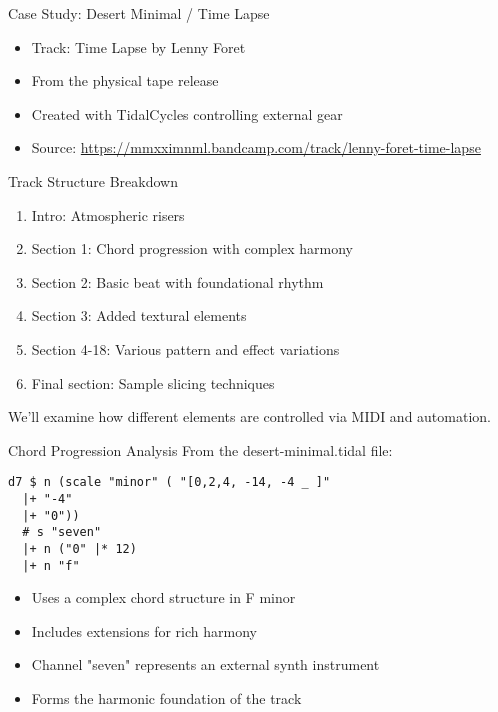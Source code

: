 \documentclass{beamer}
\begin{document}
\begin{frame}{Case Study: Desert Minimal / Time Lapse}
\begin{itemize}
    \item Track: Time Lapse by Lenny Foret
    \item From the physical tape release
    \item Created with TidalCycles controlling external gear
    \item Source: \url{https://mmxximnml.bandcamp.com/track/lenny-foret-time-lapse}
\end{itemize}
\end{frame}


\begin{frame}[fragile]{Track Structure Breakdown}
\begin{enumerate}
    \item Intro: Atmospheric risers
    \item Section 1: Chord progression with complex harmony
    \item Section 2: Basic beat with foundational rhythm
    \item Section 3: Added textural elements
    \item Section 4-18: Various pattern and effect variations
    \item Final section: Sample slicing techniques
\end{enumerate}

We'll examine how different elements are controlled via MIDI and automation.
\end{frame}

\begin{frame}[fragile]{Chord Progression Analysis}
From the desert-minimal.tidal file:

\begin{lstlisting}[style=tidal]
d7 $ n (scale "minor" ( "[0,2,4, -14, -4 _ ]" 
  |+ "-4" 
  |+ "0")) 
  # s "seven" 
  |+ n ("0" |* 12) 
  |+ n "f" 
\end{lstlisting}

\begin{itemize}
    \item Uses a complex chord structure in F minor
    \item Includes extensions for rich harmony
    \item Channel "seven" represents an external synth instrument
    \item Forms the harmonic foundation of the track
\end{itemize}
\end{frame}
\end{document}
